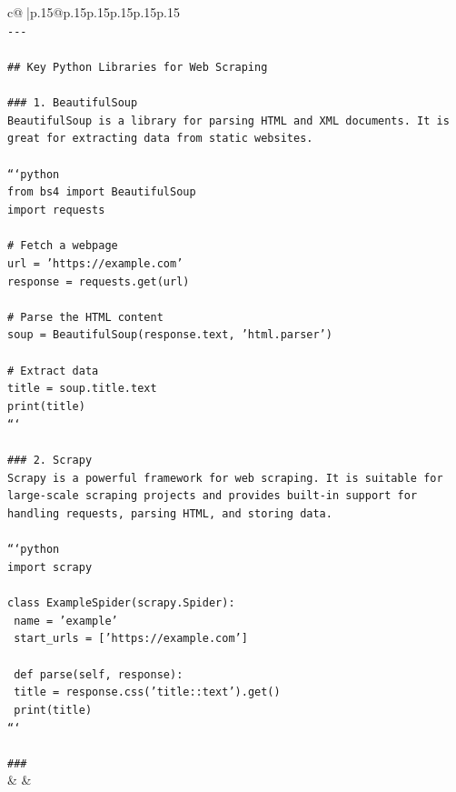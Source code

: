 \documentclass{article}
\begin{document}
{\begin{supertabular}{c@{$\;$}|p{.15\linewidth}@{}p{.15\linewidth}p{.15\linewidth}p{.15\linewidth}p{.15\linewidth}p{.15\linewidth}}
{{{\\ 
\texttt{{-}{-}{-}} \\
\\ 
\texttt{\#\# Key Python Libraries for Web Scraping} \\
\\ 
\texttt{\#\#\# 1. BeautifulSoup} \\
\texttt{BeautifulSoup is a library for parsing HTML and XML documents. It is great for extracting data from static websites.} \\
\\ 
\texttt{```python} \\
\texttt{from bs4 import BeautifulSoup} \\
\texttt{import requests} \\
\\ 
\texttt{\# Fetch a webpage} \\
\texttt{url = 'https://example.com'} \\
\texttt{response = requests.get(url)} \\
\\ 
\texttt{\# Parse the HTML content} \\
\texttt{soup = BeautifulSoup(response.text, 'html.parser')} \\
\\ 
\texttt{\# Extract data} \\
\texttt{title = soup.title.text} \\
\texttt{print(title)} \\
\texttt{```} \\
\\ 
\texttt{\#\#\# 2. Scrapy} \\
\texttt{Scrapy is a powerful framework for web scraping. It is suitable for large{-}scale scraping projects and provides built{-}in support for handling requests, parsing HTML, and storing data.} \\
\\ 
\texttt{```python} \\
\texttt{import scrapy} \\
\\ 
\texttt{class ExampleSpider(scrapy.Spider):} \\
\texttt{    name = 'example'} \\
\texttt{    start\_urls = {[}'https://example.com'{]}} \\
\\ 
\texttt{    def parse(self, response):} \\
\texttt{        title = response.css('title::text').get()} \\
\texttt{        print(title)} \\
\texttt{```} \\
\\ 
\texttt{\#\#\#} \\
            }
        }
    }
    & & \\ \\


\end{supertabular}}
\end{document}
